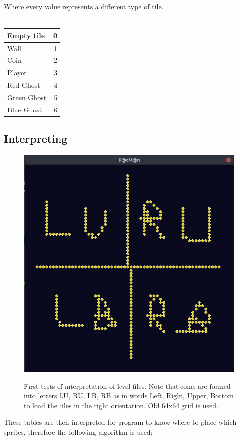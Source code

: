 \documentclass[11pt,a4paper]{report}
\newcommand{\dsubsection}[1]{\FloatBarrier \subsection{#1}}
\newenvironment{img}{
	\begin{center}
		\begin{figure}[H]
			\begin{center}
			
}{
	\end{center}
		\end{figure}
			\end{center}
}
\begin{document}
				\newpage
				Where every value represents a different type of tile.\\ \\
				\begin{tabular}{| l | r |}
					\hline 
					Empty tile & 0 \\ \hline
					Wall & 1 \\ \hline
					Coin & 2 \\ \hline
					Player & 3 \\ \hline
					Red Ghost & 4 \\ \hline
					Green Ghost & 5 \\ \hline
					Blue Ghost & 6 \\ 
					\hline
				\end{tabular}
			\dsubsection{Interpreting}
				\begin{img}
					\includegraphics[width=350pt]{images/aligning-level}\\
					\caption{First tests of interpretation of level files. Note that coins are formed into letters LU, RU, LB, RB as in words Left, Right, Upper, Bottom to load the tiles in the right orientation. Old 64x64 grid is used.}
				\end{img}
				These tables are then interpreted for program to know where to place which sprites, therefore the following algorithm is used:\\
\end{document}
